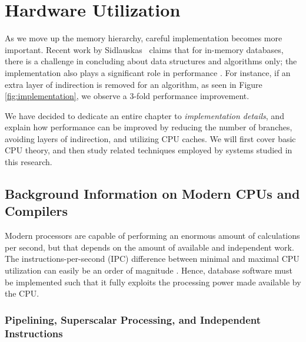 \chapter{Hardware Utilization}
\label{chap:Hardware Utilization}

As we move up the memory hierarchy, careful implementation becomes more important. Recent work by Sidlauskas \ea~claims that for in-memory databases, there is a challenge in concluding about data structures and algorithms only; the implementation also plays a significant role in performance \cite{Sidlauskas2014-ef}. For instance, if an extra layer of indirection is removed for an algorithm, as seen in Figure \ref{fig:implementation}, we observe a 3-fold performance improvement. 

We have decided to dedicate an entire chapter to \textit{implementation details}, and explain how performance can be improved by reducing the number of branches, avoiding layers of indirection, and utilizing CPU caches. We will first cover basic CPU theory, and then study related techniques employed by systems studied in this research.

\newpage

\section{Background Information on Modern CPUs and Compilers}
\label{sec:Background Information on Modern CPUs and Compilers}
Modern processors are capable of performing an enormous amount of calculations per second, but that depends on the amount of available and independent work. The instructions-per-second (IPC) difference between minimal and maximal CPU utilization can easily be an order of magnitude \cite{Boncz2005-wj}. Hence, database software must be implemented such that it fully exploits the processing power made available by the CPU.

\subsection{Pipelining, Superscalar Processing, and Independent Instructions}
\label{sub:Pipelining, Superscalar Processing, and Independent Instructions}

